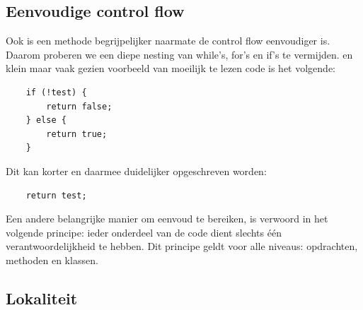 \documentclass{article}
\begin{document}
	\subsection{Eenvoudige control flow}
	Ook is een methode begrijpelijker naarmate de control flow eenvoudiger is. Daarom proberen we een diepe nesting van while’s, for’s en if’s te vermijden. en klein maar vaak gezien voorbeeld van moeilijk te lezen code is het volgende: \\
	
	\begin{verbatim}
	if (!test) {
		return false;
	} else {
		return true;
	}
	\end{verbatim}
	Dit kan korter en daarmee duidelijker opgeschreven worden:

	\begin{verbatim}
	return test;
	\end{verbatim}
	
	Een andere belangrijke manier om eenvoud te bereiken, is verwoord
	in het volgende principe: ieder onderdeel van de code dient slechts één
	verantwoordelijkheid te hebben. Dit principe geldt voor alle niveaus:
	opdrachten, methoden en klassen. \\
	
	\subsection{Lokaliteit}
	
\end{document}
